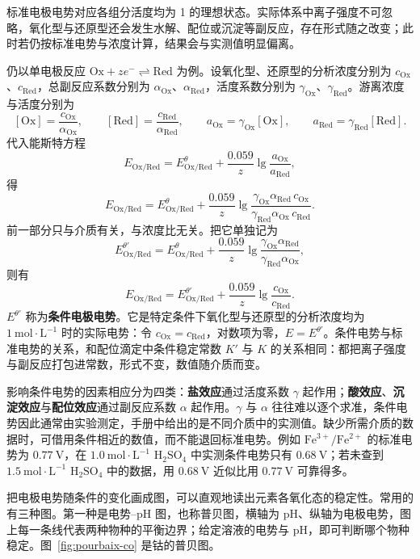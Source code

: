 \documentclass[UTF8]{ctexbook}
\begin{document}
标准电极电势对应各组分活度均为 1 的理想状态。实际体系中离子强度不可忽略，氧化型与还原型还会发生水解、配位或沉淀等副反应，存在形式随之改变；此时若仍按标准电势与浓度计算，结果会与实测值明显偏离。

仍以单电极反应 \(\mathrm{Ox}+z e^-\rightleftharpoons\mathrm{Red}\) 为例。设氧化型、还原型的分析浓度分别为 \(c_{\mathrm{Ox}}\)、\(c_{\mathrm{Red}}\)，总副反应系数分别为 \(\alpha_{\mathrm{Ox}}\)、\(\alpha_{\mathrm{Red}}\)，活度系数分别为 \(\gamma_{\mathrm{Ox}}\)、\(\gamma_{\mathrm{Red}}\)。游离浓度与活度分别为
\[
[\mathrm{Ox}]=\frac{c_{\mathrm{Ox}}}{\alpha_{\mathrm{Ox}}},
\qquad
[\mathrm{Red}]=\frac{c_{\mathrm{Red}}}{\alpha_{\mathrm{Red}}},
\qquad
a_{\mathrm{Ox}}=\gamma_{\mathrm{Ox}}[\mathrm{Ox}],
\qquad
a_{\mathrm{Red}}=\gamma_{\mathrm{Red}}[\mathrm{Red}].
\]
代入能斯特方程
\[
E_{\mathrm{Ox/Red}}
=E^\theta_{\mathrm{Ox/Red}}
+\frac{0.059}{z}\lg\frac{a_{\mathrm{Ox}}}{a_{\mathrm{Red}}},
\]
得
\[
E_{\mathrm{Ox/Red}}
=E^\theta_{\mathrm{Ox/Red}}
+\frac{0.059}{z}\lg
\frac{\gamma_{\mathrm{Ox}}\alpha_{\mathrm{Red}}\,c_{\mathrm{Ox}}}
{\gamma_{\mathrm{Red}}\alpha_{\mathrm{Ox}}\,c_{\mathrm{Red}}}.
\]
前一部分只与介质有关，与浓度比无关。把它单独记为
\[
E^{\theta'}_{\mathrm{Ox/Red}}
=E^\theta_{\mathrm{Ox/Red}}
+\frac{0.059}{z}\lg
\frac{\gamma_{\mathrm{Ox}}\alpha_{\mathrm{Red}}}
{\gamma_{\mathrm{Red}}\alpha_{\mathrm{Ox}}},
\]
则有
\[
E_{\mathrm{Ox/Red}}
=E^{\theta'}_{\mathrm{Ox/Red}}
+\frac{0.059}{z}\lg\frac{c_{\mathrm{Ox}}}{c_{\mathrm{Red}}}.
\]
\(E^{\theta'}\) 称为\textbf{条件电极电势}。它是特定条件下氧化型与还原型的分析浓度均为 \(1\ \mathrm{mol\cdot L^{-1}}\) 时的实际电势：令 \(c_{\mathrm{Ox}}=c_{\mathrm{Red}}\)，对数项为零，\(E=E^{\theta'}\)。条件电势与标准电势的关系，和配位滴定中条件稳定常数 \(K'\) 与 \(K\) 的关系相同：都把离子强度与副反应打包进常数，形式不变，数值随介质而变。

影响条件电势的因素相应分为四类：\textbf{盐效应}通过活度系数 \(\gamma\) 起作用；\textbf{酸效应}、\textbf{沉淀效应}与\textbf{配位效应}通过副反应系数 \(\alpha\) 起作用。\(\gamma\) 与 \(\alpha\) 往往难以逐个求准，条件电势因此通常由实验测定，手册中给出的是不同介质中的实测值。缺少所需介质的数据时，可借用条件相近的数值，而不能退回标准电势。例如 \(\mathrm{Fe^{3+}/Fe^{2+}}\) 的标准电势为 \(0.77\ \mathrm{V}\)，在 \(1.0\ \mathrm{mol\cdot L^{-1}}\) \(\mathrm{H_2SO_4}\) 中实测条件电势只有 \(0.68\ \mathrm{V}\)；若未查到 \(1.5\ \mathrm{mol\cdot L^{-1}}\) \(\mathrm{H_2SO_4}\) 中的数据，用 \(0.68\ \mathrm{V}\) 近似比用 \(0.77\ \mathrm{V}\) 可靠得多。

\label{sec:cond-potential}
把电极电势随条件的变化画成图，可以直观地读出元素各氧化态的稳定性。常用的有三种图。第一种是电势--\(\mathrm{pH}\) 图，也称普贝图，横轴为 \(\mathrm{pH}\)、纵轴为电极电势，图上每一条线代表两种物种的平衡边界；给定溶液的电势与 \(\mathrm{pH}\)，即可判断哪个物种稳定。图~\ref{fig:pourbaix-co} 是钴的普贝图。
\end{document}
